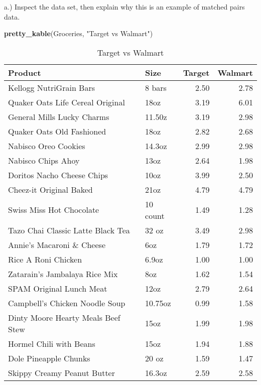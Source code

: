 \documentclass[
  12pt,
]{report}
\newenvironment{Shaded}{\begin{snugshade}}{\end{snugshade}}
\newcommand{\KeywordTok}[1]{\textcolor[rgb]{0.13,0.29,0.53}{\textbf{#1}}}
\newcommand{\NormalTok}[1]{#1}
\newcommand{\StringTok}[1]{\textcolor[rgb]{0.31,0.60,0.02}{#1}}
\begin{document}
a.) Inspect the data set, then explain why this is an example of matched
pairs data.

\begin{Shaded}
\begin{Highlighting}[]
\KeywordTok{pretty_kable}\NormalTok{(Groceries, }\StringTok{"Target vs Walmart"}\NormalTok{)}
\end{Highlighting}
\end{Shaded}

\begin{table}[!h]

\caption{\label{tab:unnamed-chunk-31}Target vs Walmart}
\centering
\begin{tabular}[t]{l|l|r|r}
\hline
Product & Size & Target & Walmart\\
\hline
Kellogg NutriGrain Bars & 8 bars & 2.50 & 2.78\\
\hline
Quaker Oats Life Cereal  Original & 18oz & 3.19 & 6.01\\
\hline
General Mills Lucky Charms & 11.50z & 3.19 & 2.98\\
\hline
Quaker Oats Old Fashioned & 18oz & 2.82 & 2.68\\
\hline
Nabisco Oreo Cookies & 14.3oz & 2.99 & 2.98\\
\hline
Nabisco Chips Ahoy & 13oz & 2.64 & 1.98\\
\hline
Doritos Nacho Cheese Chips & 10oz & 3.99 & 2.50\\
\hline
Cheez-it Original Baked & 21oz & 4.79 & 4.79\\
\hline
Swiss Miss Hot Chocolate & 10 count & 1.49 & 1.28\\
\hline
Tazo Chai Classic Latte Black Tea & 32 oz & 3.49 & 2.98\\
\hline
Annie's Macaroni \& Cheese & 6oz & 1.79 & 1.72\\
\hline
Rice A Roni Chicken & 6.9oz & 1.00 & 1.00\\
\hline
Zatarain's Jambalaya Rice Mix & 8oz & 1.62 & 1.54\\
\hline
SPAM Original Lunch Meat & 12oz & 2.79 & 2.64\\
\hline
Campbell's Chicken Noodle Soup & 10.75oz & 0.99 & 1.58\\
\hline
Dinty Moore Hearty Meals Beef Stew & 15oz & 1.99 & 1.98\\
\hline
Hormel  Chili with Beans & 15oz & 1.94 & 1.88\\
\hline
Dole Pineapple Chunks & 20 oz & 1.59 & 1.47\\
\hline
Skippy Creamy Peanut Butter & 16.3oz & 2.59 & 2.58\\

\end{tabular}
\end{table}
\end{document}
